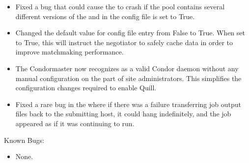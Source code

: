 \begin{itemize}
\item Fixed a bug that could cause the  to crash if the
pool contains several different versions of the  and in the
config file  is set to True.

\item Changed the default value for config file entry
 from False to True.  When set to
True, this will instruct the negotiator to safely cache data in order to
improve matchmaking performance.

\item The Condor{master} now recognizes  as a valid
  Condor daemon without any manual configuration on the part of site
  administrators.
  This simplifies the configuration changes required to enable Quill. 

\item Fixed a rare bug in the  where if there was a
  failure transferring job output files back to the submitting host,
  it could hang indefinitely, and the job appeared as if it was
  continuing to run.

\end{itemize}


\noindent Known Bugs:

\begin{itemize}

\item None.

\end{itemize}

